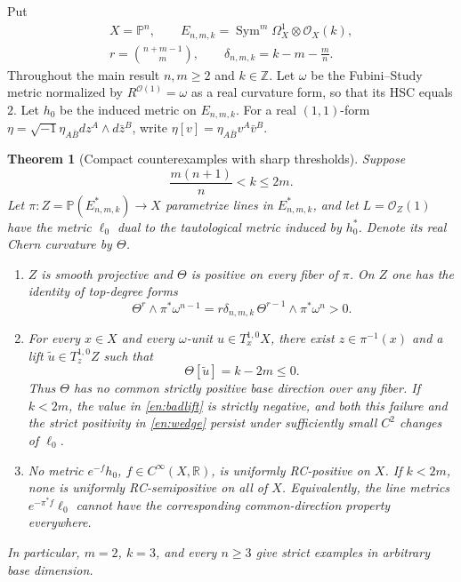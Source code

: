 \documentclass[12pt]{amsart}
\newtheorem{thm}{Theorem}[section]
\theoremstyle{definition}
\theoremstyle{remark}
\numberwithin{equation}{section}
\DeclareMathOperator{\Sym}{Sym}
\newcommand{\R}{\mathbb{R}}
\newcommand{\Z}{\mathbb{Z}}
\newcommand{\E}{E_{n,m,k}}
\newcommand{\Pp}{\mathbb P}
\newcommand{\cst}{\delta_{n,m,k}}
\newcommand{\eref}[1]{\eqref{en:#1}}
\begin{document}
Put
\begin{equation}\label{en:parameters}
\begin{gathered}
X=\Pp^n,\qquad
\E=\Sym^m\Omega_X^1\otimes\mathcal O_X(k),\\
r=\binom{n+m-1}{m},\qquad
\cst=k-m-\frac mn.
\end{gathered}
\end{equation}
Throughout the main result $n,m\ge2$ and $k\in\Z$. Let $\omega$ be the Fubini--Study metric normalized by $R^{\mathcal O(1)}=\omega$ as a real curvature form, so that its HSC equals $2$. Let $h_0$ be the induced metric on $\E$. For a real $(1,1)$-form $\eta=\sqrt{-1}\eta_{A\bar B}dz^A\wedge d\bar z^B$, write $\eta[v]=\eta_{A\bar B}v^A\bar v^B$.

\begin{thm}[Compact counterexamples with sharp thresholds]\label{en:main}
Suppose
\begin{equation}\label{en:gap}
\frac{m(n+1)}n<k\le2m.
\end{equation}
Let $\pi:Z=\Pp(\E^*)\to X$ parametrize lines in $\E^*$, and let $L=\mathcal O_Z(1)$ have the metric $\ell_0$ dual to the tautological metric induced by $h_0^*$. Denote its real Chern curvature by $\Theta$.
\begin{enumerate}
\item $Z$ is smooth projective and $\Theta$ is positive on every fiber of $\pi$. On $Z$ one has the identity of top-degree forms
\begin{equation}\label{en:wedge}
\Theta^r\wedge\pi^*\omega^{n-1}
=r\cst\,\Theta^{r-1}\wedge\pi^*\omega^n>0.
\end{equation}
\item For every $x\in X$ and every $\omega$-unit $u\in T_x^{1,0}X$, there exist $z\in\pi^{-1}(x)$ and a lift $\widetilde u\in T_z^{1,0}Z$ such that
\begin{equation}\label{en:badlift}
\Theta[\widetilde u]=k-2m\le0.
\end{equation}
Thus $\Theta$ has no common strictly positive base direction over any fiber. If $k<2m$, the value in \eref{badlift} is strictly negative, and both this failure and the strict positivity in \eref{wedge} persist under sufficiently small $C^2$ changes of $\ell_0$.
\item No metric $e^{-f}h_0$, $f\in C^\infty(X,\R)$, is uniformly RC-positive on $X$. If $k<2m$, none is uniformly RC-semipositive on all of $X$. Equivalently, the line metrics $e^{-\pi^*f}\ell_0$ cannot have the corresponding common-direction property everywhere.
\end{enumerate}
In particular, $m=2$, $k=3$, and every $n\ge3$ give strict examples in arbitrary base dimension.
\end{thm}
\end{document}
